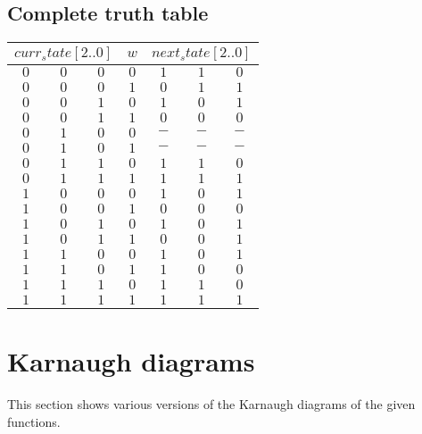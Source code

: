\documentclass [15pt,a4paper,twoside]{article}
\begin{document}
\subsection{Complete truth table}
\begin{center}
\begin{tabular}{cccc|ccc}
\multicolumn{3}{c}{$curr_state[2..0]$}&$w$&\multicolumn{3}{c}{$next_state[2..0]$}\\
\hline
$0$&$0$&$0$&$0$&$1$&$1$&$0$\\
$0$&$0$&$0$&$1$&$0$&$1$&$1$\\
$0$&$0$&$1$&$0$&$1$&$0$&$1$\\
$0$&$0$&$1$&$1$&$0$&$0$&$0$\\
$0$&$1$&$0$&$0$&$-$&$-$&$-$\\
$0$&$1$&$0$&$1$&$-$&$-$&$-$\\
$0$&$1$&$1$&$0$&$1$&$1$&$0$\\
$0$&$1$&$1$&$1$&$1$&$1$&$1$\\
$1$&$0$&$0$&$0$&$1$&$0$&$1$\\
$1$&$0$&$0$&$1$&$0$&$0$&$0$\\
$1$&$0$&$1$&$0$&$1$&$0$&$1$\\
$1$&$0$&$1$&$1$&$0$&$0$&$1$\\
$1$&$1$&$0$&$0$&$1$&$0$&$1$\\
$1$&$1$&$0$&$1$&$1$&$0$&$0$\\
$1$&$1$&$1$&$0$&$1$&$1$&$0$\\
$1$&$1$&$1$&$1$&$1$&$1$&$1$\\

\end{tabular}
\end{center}
\section{Karnaugh diagrams}
This section shows various versions of the Karnaugh diagrams of the given functions.
\end{document}

